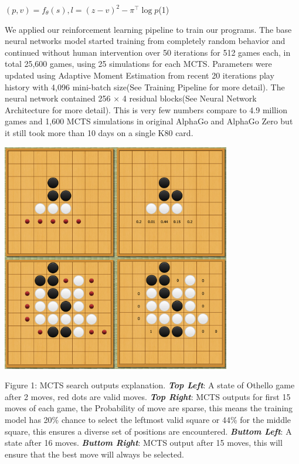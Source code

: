 \documentclass[12pt,a4paper]{article}
\begin{document}
\begin{flushleft}\hspace{4.5cm} \((p, v) = f_θ(s),\)\hspace{1cm}\(l = (z − v)^2 − \pi^\top \log p\)\hfill(1) \end{flushleft} \par
We applied our reinforcement learning pipeline to train our programs. The base neural networks model started training from completely random behavior and continued without human intervention over 50 iterations for 512 games each, in total 25,600 games, using 25 simulations for each MCTS. Parameters were updated using Adaptive Moment Estimation\cite{Adam} from recent 20 iterations play history with 4,096 mini-batch size(See Training Pipeline for more detail). The neural network contained 256 × 4 residual blocks(See Neural Network Architecture for more detail). This is very few numbers compare to 4.9 million games and 1,600 MCTS simulations in original AlphaGo and AlphaGo Zero but it still took more than 10 days on a single K80 card.\par
\clearpage

\includegraphics[width=0.75\textwidth]{Othboard.png}\par
\begin{small}
Figure 1: MCTS search outputs explanation. \textit{\textbf{Top Left}}: A state of Othello game after 2 moves, red dots are valid moves. \textit{\textbf{Top Right}}: MCTS outputs for first 15 moves of each game, the Probability of move are sparse, this means the training model has 20\% chance to select the leftmost valid square or 44\% for the middle square, this ensures a diverse set of positions are encountered. \textit{\textbf{Buttom Left}}: A state after 16 moves.  \textit{\textbf{Buttom Right}}: MCTS output after 15 moves, this will ensure that the best move will always be selected.\par
\end{small}
\end{document}
